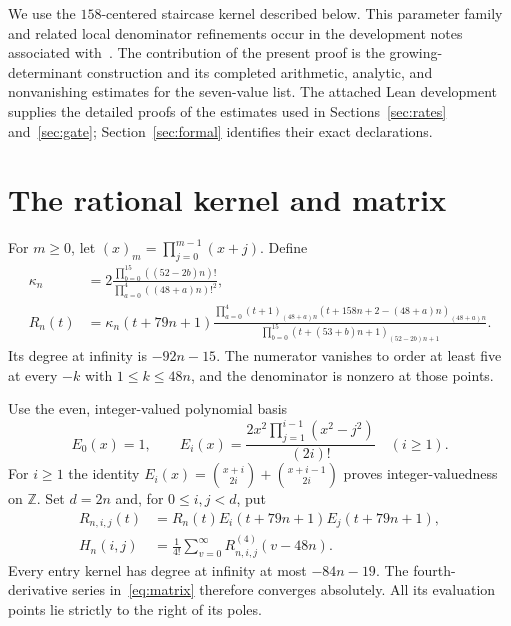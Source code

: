 \documentclass[11pt]{article}
\newcommand{\Z}{\mathbb Z}
\newcommand{\rising}[2]{(#1)_{#2}}
\begin{document}
We use the $158$-centered staircase kernel described below. This parameter
family and related local denominator refinements occur in the development
notes associated with~\cite{devincenzis}. The contribution of the present
proof is the growing-determinant construction and its completed arithmetic,
analytic, and nonvanishing estimates for the seven-value list. The attached
Lean development supplies the detailed proofs of the estimates used in
Sections~\ref{sec:rates} and~\ref{sec:gate}; Section~\ref{sec:formal}
identifies their exact declarations.

\section{The rational kernel and matrix}
For $m\geq0$, let $\rising{x}{m}=\prod_{j=0}^{m-1}(x+j)$. Define
\begin{align}
\kappa_n&=2\frac{\prod_{b=0}^{15}((52-2b)n)!}
 {\prod_{a=0}^{4}((48+a)n)!^2},\label{eq:kappa}\\
R_n(t)&=\kappa_n(t+79n+1)
 \frac{\displaystyle\prod_{a=0}^{4}
 \rising{t+1}{(48+a)n}\rising{t+158n+2-(48+a)n}{(48+a)n}}
 {\displaystyle\prod_{b=0}^{15}
 \rising{t+(53+b)n+1}{(52-2b)n+1}}.\label{eq:kernel}
\end{align}
Its degree at infinity is $-92n-15$. The numerator vanishes to order at
least five at every $-k$ with $1\leq k\leq48n$, and the denominator is
nonzero at those points.

Use the even, integer-valued polynomial basis
\begin{equation}\label{eq:basis}
E_0(x)=1,\qquad
E_i(x)=\frac{2x^2\prod_{j=1}^{i-1}(x^2-j^2)}{(2i)!}\quad(i\geq1).
\end{equation}
For $i\geq1$ the identity
$E_i(x)=\binom{x+i}{2i}+\binom{x+i-1}{2i}$ proves integer-valuedness on
$\Z$. Set $d=2n$ and, for $0\leq i,j<d$, put
\begin{align}
R_{n,i,j}(t)&=R_n(t)E_i(t+79n+1)E_j(t+79n+1),\\
H_n(i,j)&=\frac1{4!}\sum_{v=0}^{\infty}R_{n,i,j}^{(4)}(v-48n).
\label{eq:matrix}
\end{align}
Every entry kernel has degree at infinity at most $-84n-19$.
The fourth-derivative series in~\eqref{eq:matrix} therefore converges
absolutely. All its evaluation points lie strictly to the right of its poles.
\end{document}
